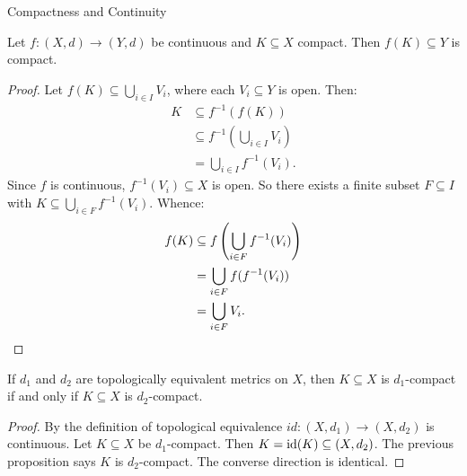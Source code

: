     Compactness and Continuity 

    \begin{proposition}\label{prop:compact-cont}
        Let $f:(X,d) \rightarrow (Y,d)$ be continuous and $K \subseteq X$ compact. Then $f(K) \subseteq Y$ is compact. 
    \end{proposition}
        \begin{proof}
            Let $f(K) \subseteq \bigcup_{i \in I}V_i$, where each $V_i \subseteq Y$ is open. Then:
                \begin{equation*}
                \begin{split}
                    K 
                    & \subseteq f^{-1} (f(K)) \\
                    & \subseteq f^{-1} \left( \bigcup_{i \in I}V_i \right) \\
                    & = \bigcup_{i \in I}f^{-1}(V_i).
                \end{split}
                \end{equation*}
            Since $f$ is continuous, $f^{-1}(V_i) \subseteq X$ is open. So there exists a finite subset $F \subseteq I$ with $K \subseteq \bigcup_{i \in F}f^{-1}(V_i)$. Whence:
                \begin{equation*}
                \begin{split}
                    f(K)
                    & \subseteq f \left( \bigcup_{i \in F}f^{-1}(V_i) \right) \\
                    & = \bigcup_{i \in F}f(f^{-1}(V_i)) \\
                    & = \bigcup_{i \in F}V_i. \qedhere
                \end{split}
                \end{equation*}
        \end{proof}

    \begin{corollary}
        If $d_1$ and $d_2$ are topologically equivalent metrics on $X$, then $K \subseteq X$ is $d_1$-compact if and only if $K \subseteq X$ is $d_2$-compact.
    \end{corollary}
        \begin{proof}
            By the definition of topological equivalence $id:(X,d_1) \rightarrow (X,d_2)$ is continuous. Let $K \subseteq X$ be $d_1$-compact. Then $K = \operatorname{id}(K) \subseteq (X,d_2)$. The previous proposition says $K$ is $d_2$-compact. The converse direction is identical.
        \end{proof}

